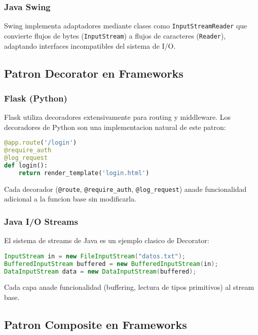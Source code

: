 \documentclass[11pt,a4paper]{article}
\begin{document}
\subsubsection{Java Swing}

Swing implementa adaptadores mediante clases como \texttt{InputStreamReader} que convierte flujos de bytes (\texttt{InputStream}) a flujos de caracteres (\texttt{Reader}), adaptando interfaces incompatibles del sistema de I/O.

\subsection{Patron Decorator en Frameworks}

\subsubsection{Flask (Python)}

Flask utiliza decoradores extensivamente para routing y middleware. Los decoradores de Python son una implementacion natural de este patron:

\begin{lstlisting}[language=Python, caption=Decoradores en Flask]
@app.route('/login')
@require_auth
@log_request
def login():
    return render_template('login.html')
\end{lstlisting}

Cada decorador (\texttt{@route}, \texttt{@require\_auth}, \texttt{@log\_request}) anade funcionalidad adicional a la funcion base sin modificarla.

\subsubsection{Java I/O Streams}

El sistema de streams de Java es un ejemplo clasico de Decorator:

\begin{lstlisting}[language=Java, caption=Decoradores en Java I/O]
InputStream in = new FileInputStream("datos.txt");
BufferedInputStream buffered = new BufferedInputStream(in);
DataInputStream data = new DataInputStream(buffered);
\end{lstlisting}

Cada capa anade funcionalidad (buffering, lectura de tipos primitivos) al stream base.

\subsection{Patron Composite en Frameworks}
\end{document}
